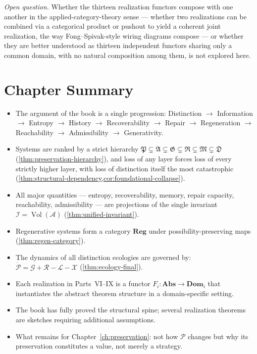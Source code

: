 \documentclass[12pt,twoside,openright]{book}
\newcommand{\adm}{\mathcal{A}}
\newcommand{\Vol}{\operatorname{Vol}}
\newenvironment{chapsummary}{%
  \begin{tcolorbox}[colback=DistBlue!5,colframe=DistBlue,
    title={\faBookOpen\enspace Summary},
    fonttitle=\sffamily\bfseries\color{white},
    attach boxed title to top left={yshift=-2mm,xshift=4mm},
    boxed title style={colback=DistBlue,rounded corners}]
  \begin{itemize}[nosep,leftmargin=*]}{%
  \end{itemize}\end{tcolorbox}}
\begin{document}
\emph{Open question.} Whether the thirteen realization functors
compose with one another in the applied-category-theory sense ---
whether two realizations can be combined via a categorical product
or pushout to yield a coherent joint realization, the way
Fong--Spivak-style wiring diagrams compose --- or whether they are
better understood as thirteen independent functors sharing only a
common domain, with no natural composition among them, is not
explored here.

\section*{Chapter Summary}
\begin{chapsummary}
  \item The argument of the book is a single progression:
        Distinction $\to$ Information $\to$ Entropy
        $\to$ History $\to$ Recoverability $\to$ Repair
        $\to$ Regeneration $\to$ Reachability
        $\to$ Admissibility $\to$ Generativity.
  \item Systems are ranked by a strict hierarchy
        $\mathfrak{P} \subsetneq \mathfrak{A}
        \subsetneq \mathfrak{G} \subsetneq \mathfrak{R}
        \subsetneq \mathfrak{M} \subsetneq \mathfrak{D}$
        (\cref{thm:preservation-hierarchy}), and loss of
        any layer forces loss of every strictly higher
        layer, with loss of distinction itself the most
        catastrophic (\cref{thm:structural-dependency,cor:foundational-collapse}).
  \item All major quantities — entropy, recoverability,
        memory, repair capacity, reachability, admissibility
        — are projections of the single invariant
        $\mathcal{I} = \Vol(\adm)$
        (\cref{thm:unified-invariant}).
  \item Regenerative systems form a category
        $\mathbf{Reg}$ under possibility-preserving maps
        (\cref{thm:regen-category}).
  \item The dynamics of all distinction ecologies are
        governed by:
        $\dot{\mathcal{P}} = \mathcal{G} + \mathcal{R}
        - \mathcal{L} - \mathcal{X}$
        (\cref{thm:ecology-final}).
  \item Each realization in Parts~VI--IX is a functor
        $F_i: \mathbf{Abs} \to \mathbf{Dom}_i$ that
        instantiates the abstract theorem structure
        in a domain-specific setting.
  \item The book has fully proved the structural spine;
        several realization theorems are sketches
        requiring additional assumptions.
  \item What remains for Chapter~\ref{ch:preservation}:
        not how $\mathcal{P}$ changes but why its
        preservation constitutes a value, not merely
        a strategy.
\end{chapsummary}
\end{document}
